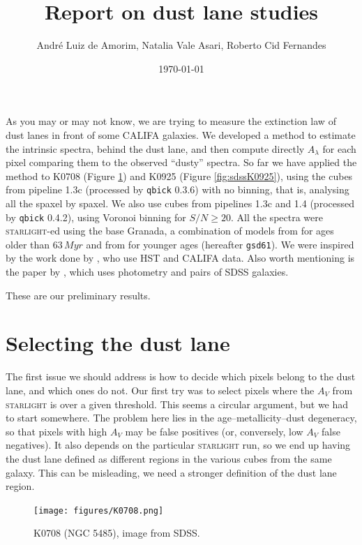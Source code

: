 \documentclass[a4paper]{article}
\author{André Luiz de Amorim, Natalia Vale Asari, Roberto Cid Fernandes}
\date{\today}
\title{Report on dust lane studies}
\def\starlight{\textsc{starlight}\xspace}
\def\qbick{\texttt{qbick}\xspace}
\def\gsd{\texttt{gsd61}\xspace}
\begin{document}
\maketitle

As you may or may not know, we are trying to measure the extinction law of dust
lanes in front of some CALIFA galaxies. We developed a method to estimate the
intrinsic spectra, behind the dust lane, and then compute directly $A_\lambda$
for each pixel comparing them to the observed ``dusty'' spectra. So far we have
applied the method to K0708 (Figure \ref{fig:sdssK0708}) and K0925 (Figure
\ref{fig:sdssK0925}), using the cubes from pipeline 1.3c (processed by \qbick
0.3.6) with no binning, that is, analysing all the spaxel by spaxel. We also use
cubes from pipelines 1.3c and 1.4 (processed by \qbick 0.4.2), using Voronoi
binning for $S/N \geq 20$. All the spectra were \starlight-ed using the base
Granada, a combination of models from \citet{Vazdekis2010} for ages older than
$63\,Myr$ and from \citet{GonzalezDelgado2005} for younger ages (hereafter
\gsd). We were inspired by the work done by \citet{Holwerda2013}, who use HST
and CALIFA data. Also worth mentioning is the paper by \citet{Wild2011}, which
uses photometry and pairs of SDSS galaxies.

These are our preliminary results.


\section{Selecting the dust lane}

The first issue we should address is how to decide which pixels belong to the
dust lane, and which ones do not. Our first try was to select pixels where the
$A_V$ from \starlight is over a given threshold. This seems a circular argument,
but we had to start somewhere. The problem here lies in the
age--metallicity--dust degeneracy, so that pixels with high $A_V$ may be false
positives (or, conversely, low $A_V$ false negatives). It also depends on the
particular \starlight run, so we end up having the dust lane defined as
different regions in the various cubes from the same galaxy. This can be
misleading, we need a stronger definition of the dust lane region.

\begin{figure}
\begin{center}
\texttt{[image: figures/K0708.png]}
\end{center}

\caption{K0708 (NGC 5485), image from SDSS.}
\label{fig:sdssK0708}
\end{figure}
\end{document}
